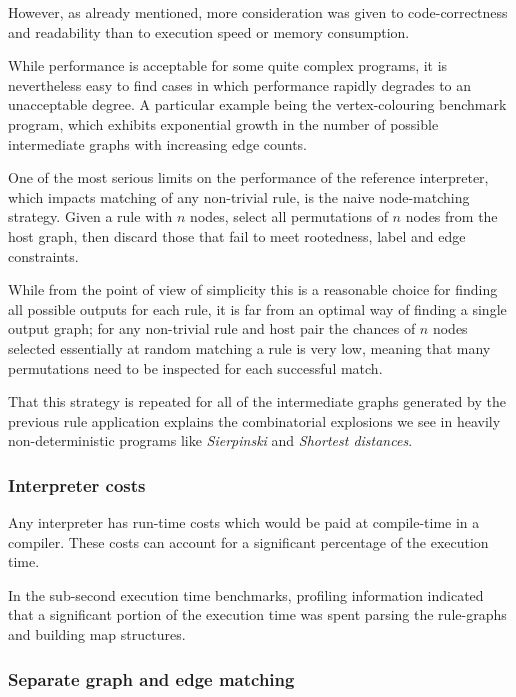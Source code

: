 However, as already mentioned, more consideration was given to code-correctness and readability than to execution speed or memory consumption.

While performance is acceptable for some quite complex programs, it is nevertheless easy to find cases in which performance rapidly degrades to an unacceptable degree. A particular example being the vertex-colouring benchmark program, which exhibits exponential growth in the number of possible intermediate graphs with increasing edge counts.

One of the most serious limits on the performance of the reference interpreter, which impacts matching of any non-trivial rule, is the naive node-matching strategy. Given a rule with $n$ nodes, select all permutations of $n$ nodes from the host graph, then discard those that fail to meet rootedness, label and edge constraints.

While from the point of view of simplicity this is a reasonable choice for finding all possible outputs for each rule, it is far from an optimal way of finding a single output graph; for any non-trivial rule and host pair the chances of $n$ nodes selected essentially at random matching a rule is very low, meaning that many permutations need to be inspected for each successful match.

That this strategy is repeated for all of the intermediate graphs generated by the previous rule application explains the combinatorial explosions we see in heavily non-deterministic programs like \textit{Sierpinski} and \textit{Shortest distances}.

\subsubsection*{Interpreter costs}

Any interpreter has run-time costs which would be paid at compile-time in a compiler. These costs can account for a significant percentage of the execution time.

In the sub-second execution time benchmarks, profiling information indicated that a significant portion of the execution time was spent parsing the rule-graphs and building map structures.


\subsubsection*{Separate graph and edge matching}

